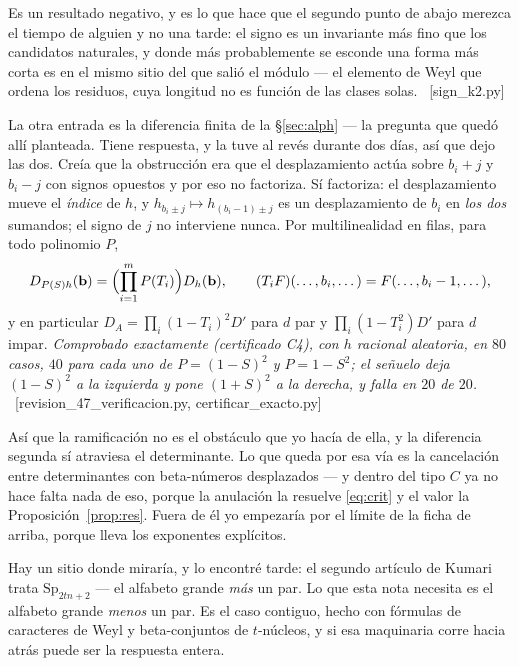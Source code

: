 \documentclass[11pt,a4paper]{article}
\newcommand{\Sp}{\mathrm{Sp}}
\newcommand{\ver}[1]{\unskip\penalty0\ \textcolor{azul}{\small\textsf{[#1]}}}
\begin{document}
\noindent Es un resultado negativo, y es lo que hace que el segundo punto de abajo merezca el tiempo
de alguien y no una tarde: el signo es un invariante más fino que los candidatos naturales, y donde
más probablemente se esconde una forma más corta es en el mismo sitio del que salió el módulo --- el
elemento de Weyl que ordena los residuos, cuya longitud no es función de las clases solas.
\ver{sign\_k2.py}

\noindent La otra entrada es la diferencia finita de la \S\ref{sec:alph} --- la pregunta que quedó
allí planteada. Tiene respuesta, y la tuve al revés durante dos días, así que dejo las dos. Creía
que la obstrucción era que el desplazamiento actúa sobre $b_i+j$ y $b_i-j$ con signos opuestos y por
eso no factoriza. Sí
factoriza: el desplazamiento mueve el \emph{índice} de $h$, y $h_{b_i\pm j}\mapsto h_{(b_i-1)\pm j}$
es un desplazamiento de $b_i$ en \emph{los dos} sumandos; el signo de $j$ no interviene nunca. Por
multilinealidad en filas, para todo polinomio $P$,
\[
D_{P(S)h}(\mathbf b)=\Bigl(\prod_{i=1}^{m}P(T_i)\Bigr)D_h(\mathbf b),
\qquad (T_iF)(\dots,b_i,\dots)=F(\dots,b_i-1,\dots),
\]
y en particular $D_A=\prod_i(1-T_i)^2 D'$ para $d$ par y $\prod_i(1-T_i^2)D'$ para $d$ impar.
\emph{Comprobado exactamente (certificado C4), con $h$ racional aleatoria, en $80$ casos, $40$ para
cada uno de $P=(1-S)^2$ y $P=1-S^2$; el señuelo deja $(1-S)^2$ a la izquierda y pone $(1+S)^2$ a la
derecha, y falla en $20$ de $20$.}
\ver{revision\_47\_verificacion.py, certificar\_exacto.py}

\noindent Así que la ramificación no es el obstáculo que yo hacía de ella, y la diferencia segunda
sí atraviesa el determinante. Lo que queda por esa vía es la cancelación entre determinantes con
beta-números desplazados --- y dentro del tipo $C$ ya no hace falta nada de eso, porque la anulación
la resuelve \eqref{eq:crit} y el valor la Proposición~\ref{prop:res}. Fuera de él yo empezaría por
el límite de la ficha de arriba, porque lleva los exponentes explícitos.

Hay un sitio donde miraría, y lo encontré tarde: el segundo artículo de Kumari
\cite{Kum24} trata $\Sp_{2tn+2}$ --- el alfabeto grande \emph{más} un par. Lo que esta nota necesita
es el alfabeto grande \emph{menos} un par. Es el caso contiguo, hecho con fórmulas de caracteres de
Weyl y beta-conjuntos de $t$-núcleos, y si esa maquinaria corre hacia atrás puede ser la respuesta
entera.
\end{document}
